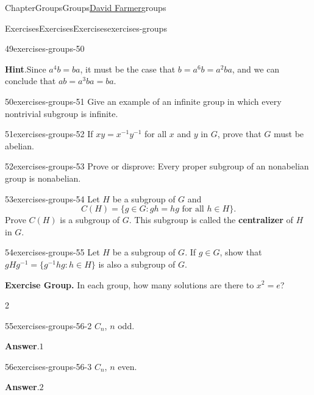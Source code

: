 \documentclass[oneside,10pt,]{book}
\newcommand{\blocktitlefont}{\relax}
\newcommand{\terminology}[1]{\textbf{#1}}
\numberwithin{equation}{section}
\begin{document}
\begin{chapterptx}{Chapter}{Groups}{}{Groups}{\hyperlink{dfarmer}{David Farmer}}{}{groups}
\begin{exercises-section}{Exercises}{Exercises}{}{Exercises}{}{}{exercises-groups}
\begin{divisionexercise}{49}{}{}{exercises-groups-50}
\par\smallskip%
\noindent\textbf{\blocktitlefont Hint}.\hypertarget{exercises-groups-50-2}{}\quad{}Since \(a^4b = ba\), it must be the case that \(b = a^6 b = a^2 b a\), and we can conclude that \(ab = a^3 b a = ba\).%
\end{divisionexercise}%
\begin{divisionexercise}{50}{}{}{exercises-groups-51}%
Give an example of an infinite group in which every nontrivial subgroup is infinite.%
\end{divisionexercise}%
\begin{divisionexercise}{51}{}{}{exercises-groups-52}%
If \(xy = x^{-1} y^{-1}\) for all \(x\) and \(y\) in \(G\), prove that \(G\) must be abelian.%
\end{divisionexercise}%
\begin{divisionexercise}{52}{}{}{exercises-groups-53}%
Prove or disprove: Every proper subgroup of an nonabelian group is nonabelian.%
\end{divisionexercise}%
\begin{divisionexercise}{53}{}{}{exercises-groups-54}%
Let \(H\) be a subgroup of \(G\) and%
\begin{equation*}
C(H) = \{ g \in G : gh = hg \text{ for all } h \in H \}.
\end{equation*}
Prove \(C(H)\) is a subgroup of \(G\).  This subgroup is called the \terminology{centralizer} of \(H\) in \(G\).%
\end{divisionexercise}%
\begin{divisionexercise}{54}{}{}{exercises-groups-55}%
Let \(H\) be a subgroup of \(G\).  If \(g \in G\), show that \(gHg^{-1} =  \{g^{-1}hg : h\in H\}\) is also a subgroup of \(G\).%
\end{divisionexercise}%
\par\medskip\noindent%
\textbf{Exercise Group.}\space\space%
In each group, how many solutions are there to \(x^2=e\)?%
\begin{exercisegroupcol}{2}
\begin{divisionexerciseegcol}{55}{}{}{exercises-groups-56-2}%
\(C_n\), \(n\) odd.%
\par\smallskip%
\noindent\textbf{\blocktitlefont Answer}.\hypertarget{exercises-groups-56-2-2}{}\quad{}\(1\)%
\end{divisionexerciseegcol}%
\begin{divisionexerciseegcol}{56}{}{}{exercises-groups-56-3}%
\(C_n\), \(n\) even.%
\par\smallskip%
\noindent\textbf{\blocktitlefont Answer}.\hypertarget{exercises-groups-56-3-2}{}\quad{}\(2\)%

\end{divisionexerciseegcol}
\end{exercisegroupcol}
\end{exercises-section}
\end{chapterptx}
\end{document}
